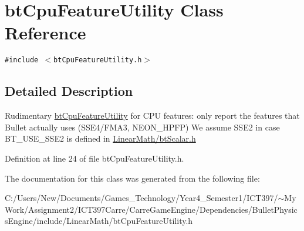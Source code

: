 \hypertarget{classbt_cpu_feature_utility}{
\section{btCpuFeatureUtility Class Reference}
\label{classbt_cpu_feature_utility}
}
{\tt \#include $<$btCpuFeatureUtility.h$>$}



\subsection{Detailed Description}
Rudimentary \hyperlink{classbt_cpu_feature_utility}{btCpuFeatureUtility} for CPU features: only report the features that Bullet actually uses (SSE4/FMA3, NEON\_\-HPFP) We assume SSE2 in case BT\_\-USE\_\-SSE2 is defined in \hyperlink{bt_scalar_8h-source}{LinearMath/btScalar.h} 

Definition at line 24 of file btCpuFeatureUtility.h.

The documentation for this class was generated from the following file:\begin{CompactItemize}
\item 
C:/Users/New/Documents/Games\_\-Technology/Year4\_\-Semester1/ICT397/$\sim$My Work/Assignment2/ICT397Carre/CarreGameEngine/Dependencies/BulletPhysicsEngine/include/LinearMath/btCpuFeatureUtility.h\end{CompactItemize}
